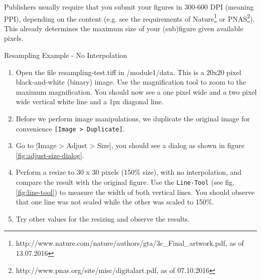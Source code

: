 Publishers usually require that you submit your figures in 300-600 DPI (meaning PPI), depending on the content (e.g. see the requirements of Nature\footnote{http://www.nature.com/nature/authors/gta/3c\_Final\_artwork.pdf, as of 13.07.2016} or PNAS\footnote{http://www.pnas.org/site/misc/digitalart.pdf, as of 07.10.2016}). This already determines the maximum size of your (sub)figure given available pixels. 

\begin{taskbox}{Resampling Example - No Interpolation}

\begin{enumerate}
	\item Open the file resampling-test.tiff in /module1/data. This is a 20x20 pixel black-and-white (binary) image. Use the magnification tool to zoom to the maximum magnification. You should now see a one pixel wide and a two pixel wide vertical white line and a 1px diagonal line. 
	\item Before we perform image manipulations, we duplicate the original image for convenience \texttt{[Image > Duplicate]}.
	\item Go to [Image > Adjust > Size], you should see a dialog as shown in figure \ref{fig:adjust-size-dialog}.
	
	\begin{minipage}[t]{\linewidth}
		\begin{center}
		\medskip
		\label{fig:adjust-size-dialog}
		\end{center}
	\end{minipage}
	
	\item Perform a resize to 30 x 30 pixels (150\% size), with no interpolation, and compare the result with the original figure. Use the \texttt{Line-Tool} (see fig. \ref{fig:line-tool}) to measure the width of both vertical lines. You should observe that one line was not scaled while the other was scaled to 150\%.
	
	\begin{minipage}[t]{\linewidth}
		\begin{center}
		\medskip
		\label{fig:line-tool}
		\end{center}
	\end{minipage}
	
	\item Try other values for the resizing and observe the results.
\end{enumerate}

\end{taskbox}

